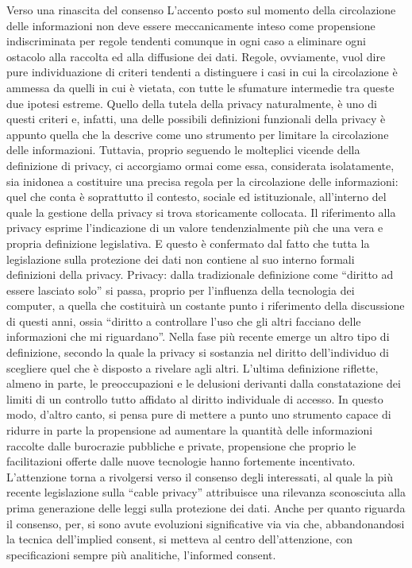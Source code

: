 Verso una rinascita del consenso
L’accento posto sul momento della circolazione delle informazioni non deve essere meccanicamente inteso come propensione indiscriminata per regole tendenti comunque in ogni caso a eliminare ogni ostacolo alla raccolta ed alla diffusione dei dati. Regole, ovviamente, vuol dire pure individuazione di criteri tendenti a distinguere i casi in cui la circolazione è ammessa da quelli in cui è vietata, con tutte le sfumature intermedie tra queste due ipotesi estreme.
Quello della tutela della privacy naturalmente, è uno di questi criteri e, infatti, una delle possibili definizioni funzionali della privacy è appunto quella che la descrive come uno strumento per limitare la circolazione delle informazioni. Tuttavia, proprio seguendo le molteplici vicende della definizione di privacy, ci accorgiamo ormai come essa, considerata isolatamente, sia inidonea a costituire una precisa regola per la circolazione delle informazioni: quel che conta è soprattutto il contesto, sociale ed istituzionale, all’interno del quale la gestione della privacy si trova storicamente collocata. Il riferimento alla privacy esprime l’indicazione di un valore tendenzialmente più che una vera e propria definizione legislativa. E questo è confermato dal fatto che tutta la legislazione sulla protezione dei dati non contiene al suo interno formali definizioni della privacy.
Privacy: dalla tradizionale definizione come “diritto ad essere lasciato solo” si passa, proprio per l’influenza della tecnologia dei computer, a quella che costituirà un costante punto i riferimento della discussione di questi anni, ossia “diritto a controllare l’uso che gli altri facciano delle informazioni che mi riguardano”. Nella fase più recente emerge un altro tipo di definizione, secondo la quale la privacy si sostanzia nel diritto dell’individuo di scegliere quel che è disposto a rivelare agli altri. L’ultima definizione riflette, almeno in parte, le preoccupazioni e le delusioni derivanti dalla constatazione dei limiti di un controllo tutto affidato al diritto individuale di accesso. In questo modo, d’altro canto, si pensa pure di mettere a punto uno strumento capace di ridurre in parte la propensione ad aumentare la quantità delle informazioni raccolte dalle burocrazie pubbliche e private, propensione che proprio le facilitazioni offerte dalle nuove tecnologie hanno fortemente incentivato.
L’attenzione torna a rivolgersi verso il consenso degli interessati, al quale la più recente legislazione sulla “cable privacy” attribuisce una rilevanza sconosciuta alla prima generazione delle leggi sulla protezione dei dati. Anche per quanto riguarda il consenso, per, si sono avute evoluzioni significative via via che, abbandonandosi la tecnica dell’implied consent, si metteva al centro dell’attenzione, con specificazioni sempre più analitiche, l’informed consent.
